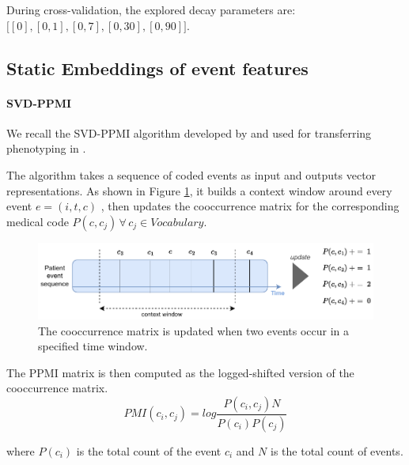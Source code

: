 \documentclass[french,12pt,twoside,a4paper]{book}
\begin{document}
\begin{appendices}

  During cross-validation, the explored decay parameters are:
  $\big[[0], [0, 1], [0, 7], [0, 30], [0, 90]\big]$.

  \subsection{Static Embeddings of event features}\label{apd:pipelines:static_embeddings}

  \paragraph{SVD-PPMI}\label{apd:medical_concept_embeddings:svdppmi} We recall the
  SVD-PPMI algorithm developed by \cite{beam2019clinical} and used for
  transferring phenotyping in \cite{hong2021clinical}.

  The algorithm takes a sequence of coded events as input and outputs vector
  representations. As shown in Figure \ref{fig:cooccurrence}, it builds a
  context window around every event $e=(i,t, c)$ , then updates the cooccurrence matrix for
  the corresponding medical code $P(c, c_j) \, \forall \, c_j \in Vocabulary$.

  \begin{figure}[htbp]
    \begin{center}
      \includegraphics[width=0.9\linewidth]{img/chapter_3/cooccurrence.pdf}
    \end{center}
    \caption{The cooccurrence matrix is updated when two events occur in a
      specified time window.} \label{fig:cooccurrence}
  \end{figure}

  The PPMI matrix is then computed as the logged-shifted version of the
  cooccurrence matrix.
  \begin{equation}\label{eq:pmi}
    PMI(c_i, c_j) = log\frac{P(c_i, c_j)N}{P(c_i)P(c_j)}
  \end{equation}

  where $P(c_i)$ is the total count of the event $c_i$ and $N$ is the total count of events.


\end{appendices}
\end{document}
